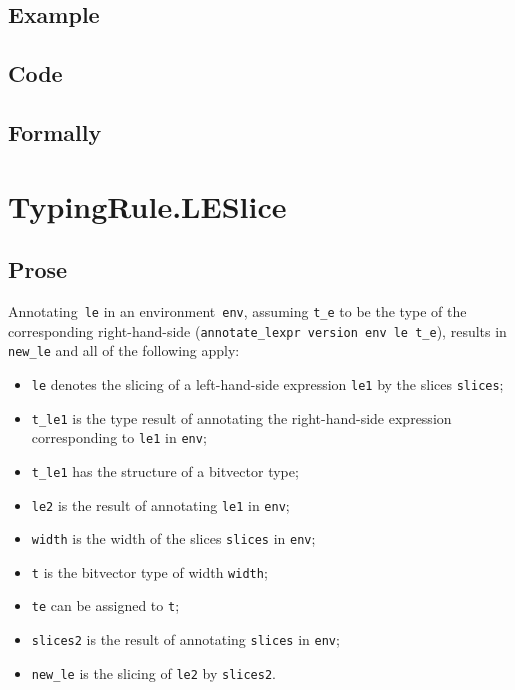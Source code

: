 \documentclass{book}
\begin{document}
  \subsection{Example}

  \subsection{Code}

\begin{emptyformal}
    \subsection{Formally}
\end{emptyformal}


\section{TypingRule.LESlice \label{sec:TypingRule.LESlice}}

  \subsection{Prose}
   Annotating~\texttt{le} in an environment~\texttt{env}, assuming
\texttt{t\_e} to be the type of the corresponding right-hand-side
(\texttt{annotate\_lexpr version env le t\_e}), results in \texttt{new\_le} and
all of the following apply:
   \begin{itemize}
   \item \texttt{le} denotes the slicing of a left-hand-side expression \texttt{le1} by the slices \texttt{slices};
   \item \texttt{t\_le1} is the type result of annotating the right-hand-side expression corresponding to \texttt{le1} in \texttt{env};
   \item \texttt{t\_le1} has the structure of a bitvector type;
   \item \texttt{le2} is the result of annotating \texttt{le1} in \texttt{env};
   \item \texttt{width} is the width of the slices \texttt{slices} in \texttt{env};
   \item \texttt{t} is the bitvector type of width \texttt{width};
   \item \texttt{te} can be assigned to \texttt{t};
   \item \texttt{slices2} is the result of annotating \texttt{slices} in \texttt{env};
   \item \texttt{new\_le} is the slicing of \texttt{le2} by \texttt{slices2}.
   \end{itemize}
\end{document}
